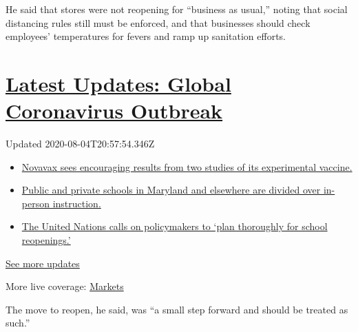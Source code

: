 He said that stores were not reopening for ``business as usual,'' noting
that social distancing rules still must be enforced, and that businesses
should check employees' temperatures for fevers and ramp up sanitation
efforts.

\hypertarget{latest-updates-global-coronavirus-outbreak}{%
\section{\texorpdfstring{\href{https://www.nytimes.com/2020/08/04/world/coronavirus-cases.html?action=click\&pgtype=Article\&state=default\&region=MAIN_CONTENT_1\&context=storylines_live_updates}{Latest
Updates: Global Coronavirus
Outbreak}}{Latest Updates: Global Coronavirus Outbreak}}\label{latest-updates-global-coronavirus-outbreak}}

Updated 2020-08-04T20:57:54.346Z

\begin{itemize}
\tightlist
\item
  \href{https://www.nytimes.com/2020/08/04/world/coronavirus-cases.html?action=click\&pgtype=Article\&state=default\&region=MAIN_CONTENT_1\&context=storylines_live_updates\#link-1228a480}{Novavax
  sees encouraging results from two studies of its experimental
  vaccine.}
\item
  \href{https://www.nytimes.com/2020/08/04/world/coronavirus-cases.html?action=click\&pgtype=Article\&state=default\&region=MAIN_CONTENT_1\&context=storylines_live_updates\#link-4825b93}{Public
  and private schools in Maryland and elsewhere are divided over
  in-person instruction.}
\item
  \href{https://www.nytimes.com/2020/08/04/world/coronavirus-cases.html?action=click\&pgtype=Article\&state=default\&region=MAIN_CONTENT_1\&context=storylines_live_updates\#link-50f7386d}{The
  United Nations calls on policymakers to `plan thoroughly for school
  reopenings.'}
\end{itemize}

\href{https://www.nytimes.com/2020/08/04/world/coronavirus-cases.html?action=click\&pgtype=Article\&state=default\&region=MAIN_CONTENT_1\&context=storylines_live_updates}{See
more updates}

More live coverage:
\href{https://www.nytimes.com/live/2020/08/04/business/stock-market-today-coronavirus?action=click\&pgtype=Article\&state=default\&region=MAIN_CONTENT_1\&context=storylines_live_updates}{Markets}

The move to reopen, he said, was ``a small step forward and should be
treated as such.''

